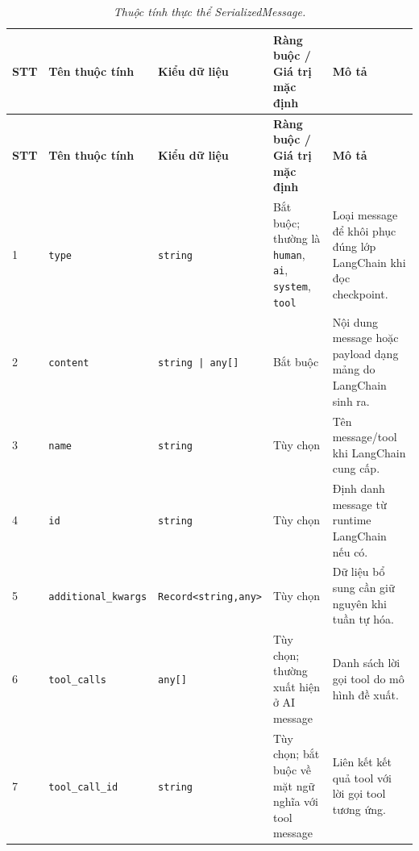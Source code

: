 \begin{longtable}{|p{0.55cm}|p{2.55cm}|p{2.7cm}|p{3.25cm}|p{4.0cm}|}
\caption{\emph{Thuộc tính thực thể SerializedMessage.}}\label{tab:erd-serialized-message}\\
\hline
\textbf{STT} & \textbf{Tên thuộc tính} & \textbf{Kiểu dữ liệu} & \textbf{Ràng buộc / Giá trị mặc định} & \textbf{Mô tả} \\
\hline
\endfirsthead
\hline
\textbf{STT} & \textbf{Tên thuộc tính} & \textbf{Kiểu dữ liệu} & \textbf{Ràng buộc / Giá trị mặc định} & \textbf{Mô tả} \\
\hline
\endhead
1 & \texttt{type} & \texttt{string} & Bắt buộc; thường là \texttt{human}, \texttt{ai}, \texttt{system}, \texttt{tool} & Loại message để khôi phục đúng lớp LangChain khi đọc checkpoint. \\
\hline
2 & \texttt{content} & \texttt{string | any[]} & Bắt buộc & Nội dung message hoặc payload dạng mảng do LangChain sinh ra. \\
\hline
3 & \texttt{name} & \texttt{string} & Tùy chọn & Tên message/tool khi LangChain cung cấp. \\
\hline
4 & \texttt{id} & \texttt{string} & Tùy chọn & Định danh message từ runtime LangChain nếu có. \\
\hline
5 & \texttt{additional}\newline\texttt{\_kwargs} & \texttt{Record<string,}\newline\texttt{any>} & Tùy chọn & Dữ liệu bổ sung cần giữ nguyên khi tuần tự hóa. \\
\hline
6 & \texttt{tool\_calls} & \texttt{any[]} & Tùy chọn; thường xuất hiện ở AI message & Danh sách lời gọi tool do mô hình đề xuất. \\
\hline
7 & \texttt{tool\_call\_id} & \texttt{string} & Tùy chọn; bắt buộc về mặt ngữ nghĩa với tool message & Liên kết kết quả tool với lời gọi tool tương ứng. \\
\hline
\end{longtable}

